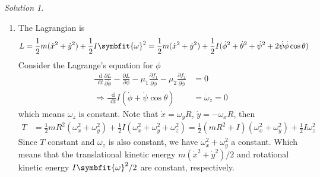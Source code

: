 \documentclass[twoside,11pt]{article}
\renewcommand*\d{\mathop{}\!\mathrm{d}}
\theoremstyle{definition}
\theoremstyle{remark}
\newtheorem*{solution}{Solution}
\begin{document}
\begin{solution}
\begin{enumerate}[label=\arabic*)]
\item The Lagrangian is
\begin{align*}
    L &= \frac{1}{2}m(\dot x^2 + \dot y^2) + \frac{1}{2} I \symbfit{\omega}^2
    = \frac{1}{2}m(\dot x^2 + \dot y^2) + \frac{1}{2}I
    (\dot\phi^2 + \dot\theta^2 + \dot\psi^2 + 2\dot\psi\dot\phi\cos\theta)
\end{align*}
Consider the Lagrange's equation for $\phi$
\begin{align*}
    \frac{\d}{\d t}\frac{\partial L}{\partial\dot\phi} 
    -\frac{\partial L}{\partial\phi}
    -\mu_1\frac{\partial f_1}{\partial\dot\phi}
    -\mu_2\frac{\partial f_2}{\partial\dot\phi} &= 0\\
    \Rightarrow \frac{\d}{\d t} I(\dot\phi + \dot\psi\cos\theta) &= 
    \dot\omega_z = 0
\end{align*}
which means $\omega_z$ is constant.
Note that $\dot x = \omega_y R$, $\dot y = -\omega_x R$,
then
\begin{align*}
    T &= \frac{1}{2}mR^2 (\omega_x^2 + \omega_y^2) + \frac{1}{2}I(\omega_x^2 + \omega_y^2 + \omega_z^2)
    = \frac{1}{2}(mR^2 + I)(\omega_x^2 + \omega_y^2) + \frac{1}{2}I\omega_z^2
\end{align*}
Since $T$ constant and $\omega_z$ is also constant, we have
$\omega_x^2+\omega_y^2$ a constant.
Which means that the translational kinetic energy $m(\dot x^2 + \dot y^2)/2$
and rotational kinetic energy $I\symbfit{\omega}^2/2$ are constant,
respectively.


\end{enumerate}
\end{solution}
\end{document}
